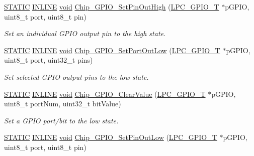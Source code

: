 \begin{DoxyCompactItemize}
\hyperlink{group__LPC__Types__Public__Macros_ga10b2d890d871e1489bb02b7e70d9bdfb}{S\-T\-A\-T\-I\-C} \hyperlink{group__LPC__Types__Public__Types_ga2eb6f9e0395b47b8d5e3eeae4fe0c116}{I\-N\-L\-I\-N\-E} \hyperlink{Paradigm_2Tern__EE_2small_2portmacro_8h_a14d32f8130d3c0b212cfc751730b5b49}{void} \hyperlink{group__GPIO__17XX__40XX_ga1447549f6e88a29b5589326f177d4a96}{Chip\-\_\-\-G\-P\-I\-O\-\_\-\-Set\-Pin\-Out\-High} (\hyperlink{structLPC__GPIO__T}{L\-P\-C\-\_\-\-G\-P\-I\-O\-\_\-\-T} $\ast$p\-G\-P\-I\-O, uint8\-\_\-t port, uint8\-\_\-t pin)
\begin{DoxyCompactList}\small\item\em Set an individual G\-P\-I\-O output pin to the high state. \end{DoxyCompactList}\item 
\hyperlink{group__LPC__Types__Public__Macros_ga10b2d890d871e1489bb02b7e70d9bdfb}{S\-T\-A\-T\-I\-C} \hyperlink{group__LPC__Types__Public__Types_ga2eb6f9e0395b47b8d5e3eeae4fe0c116}{I\-N\-L\-I\-N\-E} \hyperlink{Paradigm_2Tern__EE_2small_2portmacro_8h_a14d32f8130d3c0b212cfc751730b5b49}{void} \hyperlink{group__GPIO__17XX__40XX_ga2f85c3b0c7a48d68a508a0f94f6e691e}{Chip\-\_\-\-G\-P\-I\-O\-\_\-\-Set\-Port\-Out\-Low} (\hyperlink{structLPC__GPIO__T}{L\-P\-C\-\_\-\-G\-P\-I\-O\-\_\-\-T} $\ast$p\-G\-P\-I\-O, uint8\-\_\-t port, uint32\-\_\-t pins)
\begin{DoxyCompactList}\small\item\em Set selected G\-P\-I\-O output pins to the low state. \end{DoxyCompactList}\item 
\hyperlink{group__LPC__Types__Public__Macros_ga10b2d890d871e1489bb02b7e70d9bdfb}{S\-T\-A\-T\-I\-C} \hyperlink{group__LPC__Types__Public__Types_ga2eb6f9e0395b47b8d5e3eeae4fe0c116}{I\-N\-L\-I\-N\-E} \hyperlink{Paradigm_2Tern__EE_2small_2portmacro_8h_a14d32f8130d3c0b212cfc751730b5b49}{void} \hyperlink{group__GPIO__17XX__40XX_ga94367ee41db6fa49cfba6605324e8d07}{Chip\-\_\-\-G\-P\-I\-O\-\_\-\-Clear\-Value} (\hyperlink{structLPC__GPIO__T}{L\-P\-C\-\_\-\-G\-P\-I\-O\-\_\-\-T} $\ast$p\-G\-P\-I\-O, uint8\-\_\-t port\-Num, uint32\-\_\-t bit\-Value)
\begin{DoxyCompactList}\small\item\em Set a G\-P\-I\-O port/bit to the low state. \end{DoxyCompactList}\item 
\hyperlink{group__LPC__Types__Public__Macros_ga10b2d890d871e1489bb02b7e70d9bdfb}{S\-T\-A\-T\-I\-C} \hyperlink{group__LPC__Types__Public__Types_ga2eb6f9e0395b47b8d5e3eeae4fe0c116}{I\-N\-L\-I\-N\-E} \hyperlink{Paradigm_2Tern__EE_2small_2portmacro_8h_a14d32f8130d3c0b212cfc751730b5b49}{void} \hyperlink{group__GPIO__17XX__40XX_ga0e06760450b8e7a2c71920b06bcd6286}{Chip\-\_\-\-G\-P\-I\-O\-\_\-\-Set\-Pin\-Out\-Low} (\hyperlink{structLPC__GPIO__T}{L\-P\-C\-\_\-\-G\-P\-I\-O\-\_\-\-T} $\ast$p\-G\-P\-I\-O, uint8\-\_\-t port, uint8\-\_\-t pin)

\end{DoxyCompactItemize}
